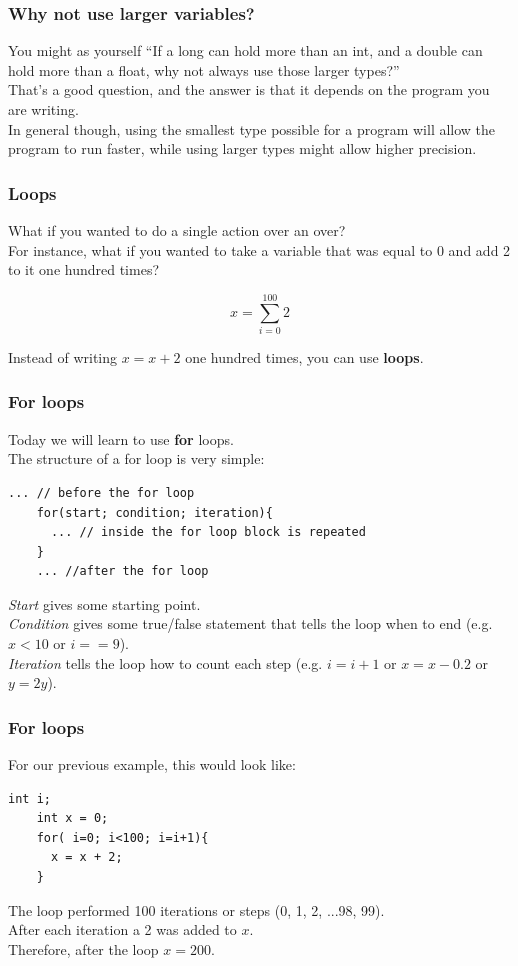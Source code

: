 \documentclass{beamer}
\begin{document}
\begin{frame}
  \frametitle{Why not use larger variables?}
  You might as yourself ``If a long can hold more than an int, and a double can hold more than a float, why not always use those larger types?''\\
  That's a good question, and the answer is that 
  it depends on the program you are writing.\\
  In general though, using the smallest type possible 
  for a program will allow the program to run faster,
  while using larger types might allow higher precision.
\end{frame}

\begin{frame}
  \frametitle{Loops}
  What if you wanted to do a single action over an over?\\
  For instance, what if you wanted to take a variable that
  was equal to 0 and add 2 to it one hundred times?\\
  \begin{center}
    \begin{equation*}
      x = \sum_{i=0}^{100}2
    \end{equation*}
  \end{center}
  Instead of writing $x = x +2$ one hundred times, you can use \textbf{loops}.
\end{frame}

\begin{frame}[fragile]
  \frametitle{For loops}
  Today we will learn to use \textbf{for} loops.\\
  The structure of a for loop is very simple:
  \begin{lstlisting}[style=customc]
    ... // before the for loop
    for(start; condition; iteration){
      ... // inside the for loop block is repeated
    }
    ... //after the for loop
  \end{lstlisting}
  \textit{Start} gives some starting point.\\ \textit{Condition} gives some
  true/false statement that tells the loop when to end (e.g. $x<10$ or $i==9$).\\
  \textit{Iteration} tells the loop how to count each step (e.g. $i=i+1$ or 
  $x = x - 0.2$ or $y = 2y$).
\end{frame}

\begin{frame}[fragile]
  \frametitle{For loops}
  For our previous example, this would look like:
  \begin{lstlisting}[style=customc]
    int i;
    int x = 0;
    for( i=0; i<100; i=i+1){
      x = x + 2;
    }
  \end{lstlisting}
  The loop performed 100 iterations or steps (0, 1, 2, ...98, 99).\\
  After each iteration a 2 was added to $x$.\\
  Therefore, after the loop $x=200$.
\end{frame}
\end{document}
